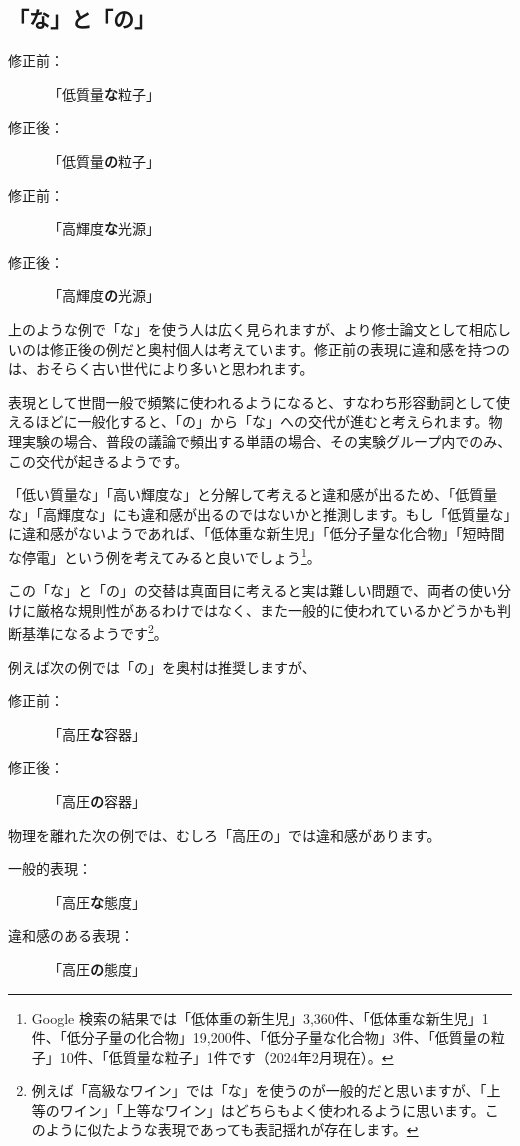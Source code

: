 \subsection{「な」と「の」}

\begin{description}
\item[修正前：]「低質量\textbf{な}粒子」
\item[修正後：]「低質量\textbf{の}粒子」
\end{description}

\begin{description}
\item[修正前：]「高輝度\textbf{な}光源」
\item[修正後：]「高輝度\textbf{の}光源」
\end{description}

上のような例で「な」を使う人は広く見られますが、より修士論文として相応しいのは修正後の例だと奥村個人は考えています。修正前の表現に違和感を持つのは、おそらく古い世代により多いと思われます。

表現として世間一般で頻繁に使われるようになると、すなわち形容動詞として使えるほどに一般化すると、「の」から「な」への交代が進むと考えられます。物理実験の場合、普段の議論で頻出する単語の場合、その実験グループ内でのみ、この交代が起きるようです。

「低い質量な」「高い輝度な」と分解して考えると違和感が出るため、「低質量な」「高輝度な」にも違和感が出るのではないかと推測します。もし「低質量な」に違和感がないようであれば、「低体重な新生児」「低分子量な化合物」「短時間な停電」という例を考えてみると良いでしょう\footnote{Google 検索の結果では「低体重の新生児」3,360件、「低体重な新生児」1件、「低分子量の化合物」19,200件、「低分子量な化合物」3件、「低質量の粒子」10件、「低質量な粒子」1件です（2024年2月現在）。}。

この「な」と「の」の交替は真面目に考えると実は難しい問題で、両者の使い分けに厳格な規則性があるわけではなく、また一般的に使われているかどうかも判断基準になるようです\footnote{例えば「高級なワイン」では「な」を使うのが一般的だと思いますが、「上等のワイン」「上等なワイン」はどちらもよく使われるように思います。このように似たような表現であっても表記揺れが存在します。}。

例えば次の例では「の」を奥村は推奨しますが、
\begin{description}
\item[修正前：]「高圧\textbf{な}容器」
\item[修正後：]「高圧\textbf{の}容器」
\end{description}
物理を離れた次の例では、むしろ「高圧の」では違和感があります。
\begin{description}
\item[一般的表現：]「高圧\textbf{な}態度」
\item[違和感のある表現：]「高圧\textbf{の}態度」
\end{description}

